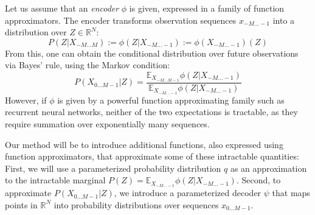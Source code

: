 \documentclass[11pt,letterpaper]{article}
\newcommand{\E}[0]{\mathbb{E}}
\newif \ifcomment
\newcommand\rljf[1]{\ifcomment{{\color{blue}(#1)}}\else{}\fi}
\begin{document}
Let us assume that an \emph{encoder} $\phi$ is given, expressed in a family of function approximators. %
The encoder transforms observation sequences $x_{-M\dots -1}$ into a distribution over $Z \in \mathbb{R}^N$: \rljf{Slight mismatch of the math and the prose here: the prose makes it sound like $\phi$ is going to be a function from $x_{-M\dots -1}$ to $Z$ but in the math it returns a probability mass/density function. Maybe write as Z = \phi($x_{-M\dots -1}$), P_\phi(Z|$x_{-M\dots -1}$) = ...}
\begin{equation}
	P(Z|X_{-M\dots M}) := \phi(Z|X_{-M\dots-1}) := \phi(X_{-M\dots-1})(Z)
\end{equation}
From this, one can obtain the conditional distribution over future observations via Bayes' rule, using the Markov condition: \rljf{Show some intermediate steps here}
\begin{equation}\label{eq:cond-fut}
	P(X_{0\dots M-1}|Z) = \frac{\E_{X_{-M \dots M-1}} \phi(Z|X_{-M\dots-1})}{\E_{X_{-M \dots -1}} \phi(Z|X_{-M \dots -1})}
\end{equation}
However, if $\phi$ is given by a powerful function approximating family such as recurrent neural networks, neither of the two expectations is tractable,  as they require summation over exponentially many sequences. \rljf{Why does this only happen for powerful function approximators? Isn't it the same number of sequences no matter the approximator? Ie doensn't it depend on $M$, not $\phi$?}

Our method will be to introduce additional functions, also expressed using function approximators, that approximate some of these intractable quantities:
First, we will use a parameterized probability distribution $q$ as an approximation to the intractable marginal $P(Z) = \E_{X_{-M \dots -1}} \phi(Z|X_{-M \dots -1})$.
Second, to approximate $P(X_{0\dots M-1}|Z)$, we introduce a parameterized decoder $\psi$ that maps points in $\mathbb{R}^N$  into probability distributions over sequences $x_{0\dots M-1}$.
\end{document}
